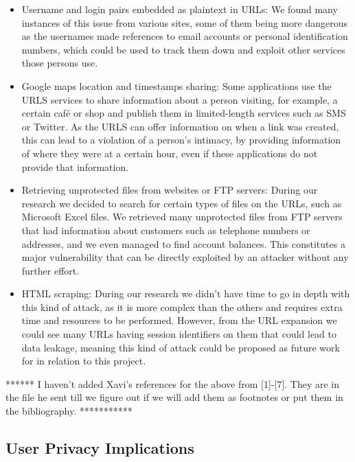 \documentclass[12pt]{article}
\begin{document}
\begin{itemize}

\item  Username and login pairs embedded as plaintext in URLs: We found many instances of this issue from various sites, some of them being more dangerous as the usernames made references to email accounts or personal identification numbers, which could be used to track them down and exploit other services those persons use.

\item  Google maps location and timestamps sharing: Some applications use the URLS services to share information about a person visiting, for example, a certain café or shop and publish them in limited-length services such as SMS or Twitter. As the URLS can offer information on when a link was created, this can lead to a violation of a person's intimacy, by providing information of where they were at a certain hour, even if these applications do not provide that information.

\item  Retrieving unprotected files from websites or FTP servers: During our research we decided to search for certain types of files on the URLs, such as Microsoft Excel files. We retrieved many unprotected files from FTP servers that had information about customers such as telephone numbers or addresses, and we even managed to find account balances. This constitutes a major vulnerability that can be directly exploited by an attacker without any further effort.

\item  HTML scraping: During our research we didn't have time to go in depth with this kind of attack, as it is more complex than the others and requires extra time and resources to be performed. However, from the URL expansion we could see many URLs having session identifiers on them that could lead to data leakage, meaning this kind of attack could be proposed as future work for in relation to this project.

\end{itemize}

****** I haven't added Xavi's references for the above from [1]-[7]. They are in the file he sent till we figure out if we will add them as footnotes or put them in the bibliography. ***********

\subsection{User Privacy Implications}
\end{document}
